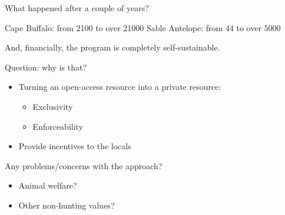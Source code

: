 \begin{frame}{What happened after a couple of years?}
\protect\hypertarget{what-happened-after-a-couple-of-years}{}

Cape Buffalo: from 2100 to over 21000 Sable Antelope: from 44 to over
5000

And, financially, the program is completely self-sustainable.

\end{frame}

\begin{frame}{}
\protect\hypertarget{section-33}{}

Question: why is that?

\end{frame}

\begin{frame}{}
\protect\hypertarget{section-34}{}

\begin{itemize}
\tightlist
\item
  Turning an open-access resource into a private resource:

  \begin{itemize}
  \tightlist
  \item
    Exclusivity
  \item
    Enforceability
  \end{itemize}
\item
  Provide incentives to the locals
\end{itemize}

\end{frame}

\begin{frame}{}
\protect\hypertarget{section-35}{}

Any problems/concerns with the approach?

\end{frame}

\begin{frame}{}
\protect\hypertarget{section-36}{}

\begin{itemize}
\tightlist
\item
  Animal welfare?
\item
  Other non-hunting values?
\end{itemize}

\end{frame}

